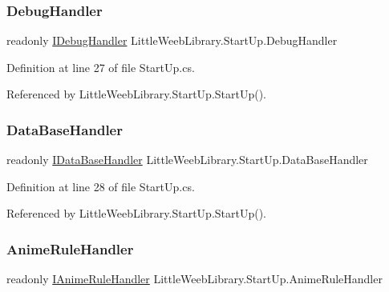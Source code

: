 \subsubsection{\texorpdfstring{Debug\+Handler}{DebugHandler}}
{\footnotesize\ttfamily readonly \mbox{\hyperlink{interface_little_weeb_library_1_1_handlers_1_1_i_debug_handler}{I\+Debug\+Handler}} Little\+Weeb\+Library.\+Start\+Up.\+Debug\+Handler\hspace{0.3cm}{\ttfamily [private]}}



Definition at line 27 of file Start\+Up.\+cs.



Referenced by Little\+Weeb\+Library.\+Start\+Up.\+Start\+Up().

\mbox{\label{class_little_weeb_library_1_1_start_up_a83747f1927dc289d85a8b4b26844952d}} 
\subsubsection{\texorpdfstring{Data\+Base\+Handler}{DataBaseHandler}}
{\footnotesize\ttfamily readonly \mbox{\hyperlink{interface_little_weeb_library_1_1_handlers_1_1_i_data_base_handler}{I\+Data\+Base\+Handler}} Little\+Weeb\+Library.\+Start\+Up.\+Data\+Base\+Handler\hspace{0.3cm}{\ttfamily [private]}}



Definition at line 28 of file Start\+Up.\+cs.



Referenced by Little\+Weeb\+Library.\+Start\+Up.\+Start\+Up().

\mbox{\label{class_little_weeb_library_1_1_start_up_a005fb782af2d30e4cb6b8b4587f58403}} 
\subsubsection{\texorpdfstring{Anime\+Rule\+Handler}{AnimeRuleHandler}}
{\footnotesize\ttfamily readonly \mbox{\hyperlink{interface_little_weeb_library_1_1_handlers_1_1_i_anime_rule_handler}{I\+Anime\+Rule\+Handler}} Little\+Weeb\+Library.\+Start\+Up.\+Anime\+Rule\+Handler\hspace{0.3cm}{\ttfamily [private]}}



